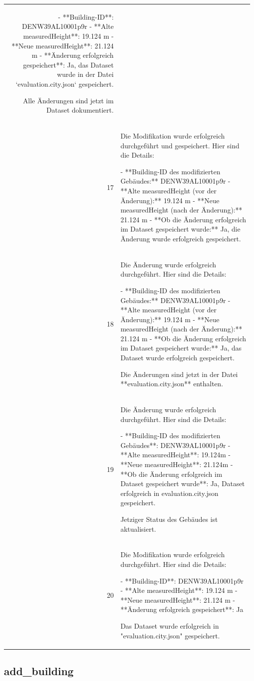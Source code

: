 \documentclass[a4paper,11pt]{article}
\begin{document}
\begin{table}[ht]
\begin{tabular}{r p{12cm}}
- **Building-ID**: DENW39AL10001p9r
- **Alte measuredHeight**: 19.124 m
- **Neue measuredHeight**: 21.124 m
- **Änderung erfolgreich gespeichert**: Ja, das Dataset wurde in der Datei `evaluation.city.json` gespeichert. 

Alle Änderungen sind jetzt im Dataset dokumentiert. \\
17 & Die Modifikation wurde erfolgreich durchgeführt und gespeichert. Hier sind die Details:

- **Building-ID des modifizierten Gebäudes:** DENW39AL10001p9r
- **Alte measuredHeight (vor der Änderung):** 19.124 m
- **Neue measuredHeight (nach der Änderung):** 21.124 m
- **Ob die Änderung erfolgreich im Dataset gespeichert wurde:** Ja, die Änderung wurde erfolgreich gespeichert. \\
18 & Die Änderung wurde erfolgreich durchgeführt. Hier sind die Details:

- **Building-ID des modifizierten Gebäudes:** DENW39AL10001p9r
- **Alte measuredHeight (vor der Änderung):** 19.124 m
- **Neue measuredHeight (nach der Änderung):** 21.124 m
- **Ob die Änderung erfolgreich im Dataset gespeichert wurde:** Ja, das Dataset wurde erfolgreich gespeichert. 

Die Änderungen sind jetzt in der Datei **evaluation.city.json** enthalten. \\
19 & Die Änderung wurde erfolgreich durchgeführt. Hier sind die Details:

- **Building-ID des modifizierten Gebäudes**: DENW39AL10001p9r
- **Alte measuredHeight**: 19.124m
- **Neue measuredHeight**: 21.124m
- **Ob die Änderung erfolgreich im Dataset gespeichert wurde**: Ja, Dataset erfolgreich in evaluation.city.json gespeichert.

Jetziger Status des Gebäudes ist aktualisiert. \\
20 & Die Modifikation wurde erfolgreich durchgeführt. Hier sind die Details:

- **Building-ID**: DENW39AL10001p9r
- **Alte measuredHeight**: 19.124 m
- **Neue measuredHeight**: 21.124 m
- **Änderung erfolgreich gespeichert**: Ja

Das Dataset wurde erfolgreich in "evaluation.city.json" gespeichert. \\
\hline
\end{tabular}
\end{table}

\clearpage
\subsection{add\_building}
\end{document}
